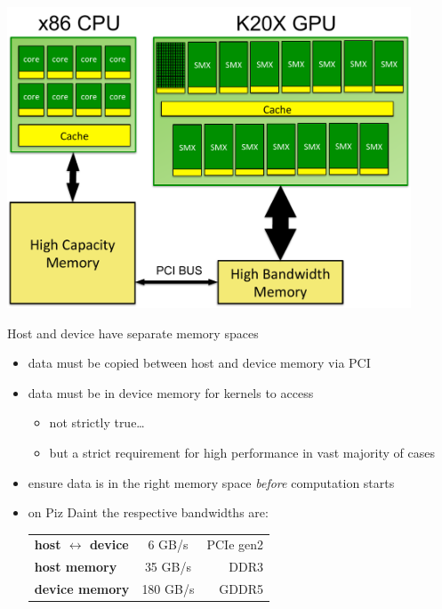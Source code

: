 
\begin{frame}[fragile]{}
    \begin{center}
        \includegraphics[width=0.9\textwidth]{./images/node.pdf}
    \end{center}
\end{frame}

\begin{frame}[fragile]{}
    \begin{info}{Host and device have separate memory spaces}
        \begin{itemize}
            \item data must be copied between host and device memory via PCI
            \item data must be in device memory for kernels to access
                \begin{itemize}
                    \item not strictly true\ldots
                    \item but a strict requirement for high performance in vast majority of cases
                \end{itemize}
            \item ensure data is in the right memory space \emph{before} computation starts
            \item on Piz Daint the respective bandwidths are:
            \begin{center}
            \begin{tabular}{lcr}
                \textbf{host $\leftrightarrow$ device} & 6 GB/s   &    PCIe gen2 \\
                \textbf{host memory}                   & 35 GB/s  &    DDR3      \\
                \textbf{device memory}                 & 180 GB/s &    GDDR5
            \end{tabular}
            \end{center}
        \end{itemize}
    \end{info}

\end{frame}


